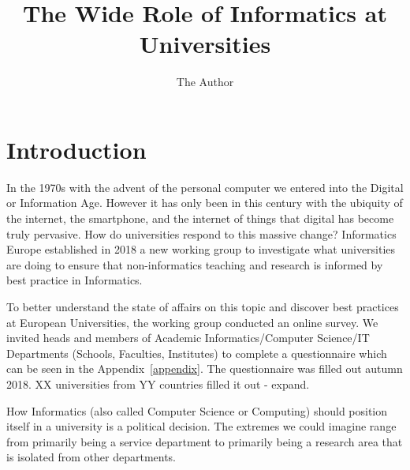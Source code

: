 \documentclass[11pt]{amsart}
\title{The Wide Role of Informatics at Universities}
\author{The Author}
\begin{document}
\maketitle
\section{Introduction}

In the 1970s with the advent of the personal computer we entered into the Digital or Information Age. However it has only been in this century with the ubiquity of the internet, the smartphone, and the internet of things that digital has become truly pervasive. How do universities respond to this massive change? Informatics Europe established in 2018 a new working group to investigate what universities are doing to ensure that non-informatics teaching and research is informed by best practice in Informatics.


To better understand the state of affairs on this topic and discover best practices at European Universities, the working group conducted an online survey. We invited heads and members of Academic Informatics/Computer Science/IT Departments (Schools, Faculties, Institutes) to complete a questionnaire which can be seen in the Appendix~\ref{appendix}. The questionnaire was filled out autumn 2018. XX universities from YY countries filled it out - expand.

How Informatics (also called Computer Science or Computing) should position itself in a university is a political decision. The extremes we could imagine range from primarily being a service department to primarily being a research area that is isolated from other departments.








\end{document}
